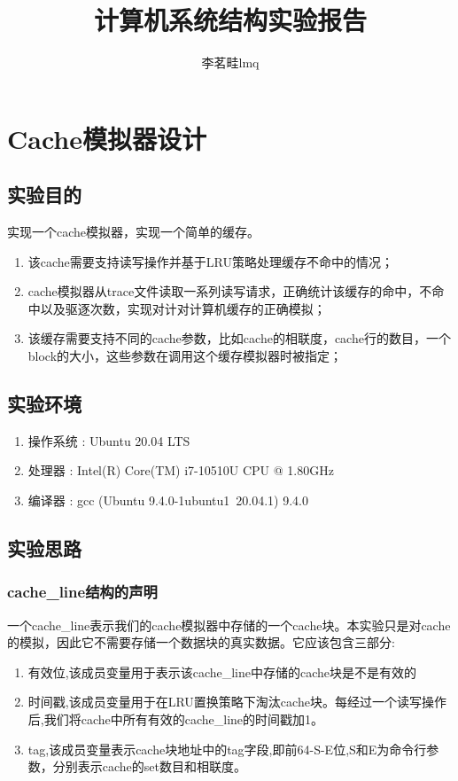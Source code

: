 \documentclass[supercite]{Experimental_Report}
\title{计算机系统结构实验报告}
\author{李茗畦lmq}
\theoremstyle{definition}
\begin{document}
\maketitle

\tableofcontents

\section{Cache模拟器设计}


\subsection{实验目的}
实现一个cache模拟器，实现一个简单的缓存。
\begin{enumerate}
\item 该cache需要支持读写操作并基于LRU策略处理缓存不命中的情况；
\item cache模拟器从trace文件读取一系列读写请求，正确统计该缓存的命中，不命中以及驱逐次数，实现对计对计算机缓存的正确模拟；
\item 该缓存需要支持不同的cache参数，比如cache的相联度，cache行的数目，一个block的大小，这些参数在调用这个缓存模拟器时被指定；
\end{enumerate}

\subsection{实验环境}
\begin{enumerate}
\item 操作系统 : Ubuntu 20.04 LTS
\item 处理器 : Intel(R) Core(TM) i7-10510U CPU @ 1.80GHz
\item 编译器 : gcc (Ubuntu 9.4.0-1ubuntu1~20.04.1) 9.4.0
\end{enumerate}



\subsection{实验思路}
\subsubsection{cache\_line结构的声明}
一个cache\_line表示我们的cache模拟器中存储的一个cache块。本实验只是对cache的模拟，因此它不需要存储一个数据块的真实数据。它应该包含三部分:
\begin{enumerate}
  \item 有效位,该成员变量用于表示该cache\_line中存储的cache块是不是有效的
  \item 时间戳,该成员变量用于在LRU置换策略下淘汰cache块。每经过一个读写操作后,我们将cache中所有有效的cache\_line的时间戳加1。
  \item tag,该成员变量表示cache块地址中的tag字段,即前64-S-E位,S和E为命令行参数，分别表示cache的set数目和相联度。
\end{enumerate}
\end{document}
